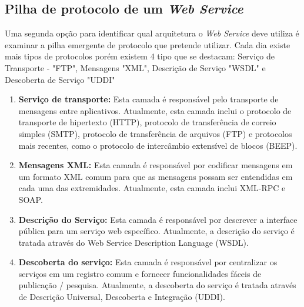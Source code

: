\documentclass[12pt]{article}
\begin{document}
\subsection{Pilha de protocolo de um \textit{Web Service}}
Uma segunda opção para identificar qual arquitetura o  \textit{Web Service} deve utiliza é examinar a pilha emergente de protocolo que pretende utilizar. Cada dia existe mais tipos de protocolos porém existem 4 tipo que se destacam: Serviço de Transporte - "FTP", Mensagens "XML", Descrição de Serviço "WSDL"  e Descoberta de Serviço "UDDI" 
\begin{enumerate}
	\item \textbf{Serviço de transporte:}
	Esta camada é responsável pelo transporte de mensagens entre aplicativos. Atualmente, esta camada inclui o protocolo de transporte de hipertexto (HTTP), protocolo de transferência de correio simples (SMTP), protocolo de transferência de arquivos (FTP) e protocolos mais recentes, como o protocolo de intercâmbio extensível de blocos (BEEP).
	\item \textbf{Mensagens XML:}
	Esta camada é responsável por codificar mensagens em um formato XML comum para que as mensagens possam ser entendidas em cada uma das extremidades. Atualmente, esta camada inclui XML-RPC e SOAP.
	\item \textbf{Descrição do Serviço:}
	Esta camada é responsável por descrever a interface pública para um serviço web específico. Atualmente, a descrição do serviço é tratada através do Web Service Description Language (WSDL).

	\item \textbf{Descoberta do serviço:}
	Esta camada é responsável por centralizar os serviços em um registro comum e fornecer funcionalidades fáceis de publicação / pesquisa. Atualmente, a descoberta do serviço é tratada através de Descrição Universal, Descoberta e Integração (UDDI).
\end{enumerate}
\end{document}
